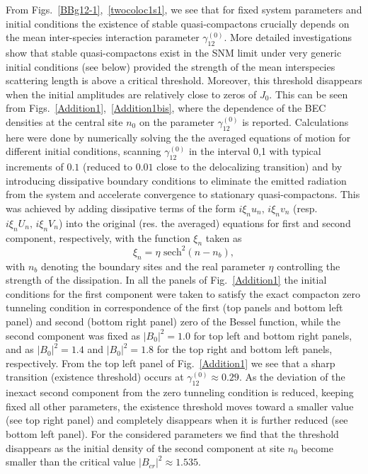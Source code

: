 \documentclass[12pt]{iopart}
\begin{document}
From Figs.~\ref{BBg12-1},~\ref{twocoloc1s1}, we see that for fixed system parameters and initial conditions  the existence  of stable quasi-compactons crucially depends on the mean inter-species interaction parameter $\gamma_{12}^{(0)}$. More detailed  investigations show that stable quasi-compactons  exist in the SNM limit under very generic initial conditions (see below) provided the strength of the mean interspecies scattering length is above a critical threshold. Moreover, this threshold disappears  when the initial amplitudes are relatively close to  zeros of $J_0$.  This can be  seen from  Figs.~\ref{Addition1},~\ref{Addition1bis},  where the dependence of the BEC densities at the central site $n_0$  on the parameter  $\gamma_{12}^{(0)}$ is reported. Calculations here were done by numerically solving the the averaged equations of motion   for different initial conditions, scanning $\gamma_{12}^{(0)}$ in the interval 0,1 with typical increments of $0.1$ (reduced to  $0.01$ close to the delocalizing transition) and by introducing  dissipative boundary conditions to eliminate the emitted radiation from the system and accelerate  convergence to stationary quasi-compactons. This  was achieved by adding dissipative terms of the form
$i\xi_{n}u_{n},\, i\xi_{n}v_{n}$ (resp. $i \xi_{n}U_{n},\, i \xi_{n}V_{n}$) into the original (res. the averaged) equations for first and second component, respectively, with the function $\xi_{n}$ taken as
\begin{equation}
\xi_{n}=\eta \textrm{ sech}^{2}\left(n-n_{b}\right),
\label{bdiss}
\end{equation}
with  $n_{b}$ denoting the boundary sites and the real parameter $\eta$ controlling the strength of the dissipation. In all the panels  of Fig.~\ref{Addition1} the initial conditions for the first component were taken to satisfy the exact compacton zero tunneling condition in correspondence of the first (top panels and bottom left panel)  and second (bottom right panel)
zero of the  Bessel function,  while the second component was fixed as $\left|B_{0}\right|^{2}=1.0$ for top left and bottom right panels, and as $\left|B_{0}\right|^{2}=1.4$ and $\left|B_{0}\right|^{2}=1.8$ for the top right and bottom left panels, respectively. From  the top left panel of Fig.~\ref{Addition1} we see that a sharp transition (existence threshold) occurs at $\gamma_{12}^{(0)} \approx 0.29$. As the deviation of the inexact second component from the zero tunneling condition is reduced, keeping fixed all other parameters,  the existence threshold moves toward a smaller value (see top right panel) and completely disappears  when it is further reduced (see bottom left panel). For the considered parameters we find   that the threshold disappears as the initial density of the second component  at site $n_0$ become smaller than the critical value $|B_{cr}|^2\approx 1.535$.
\end{document}
